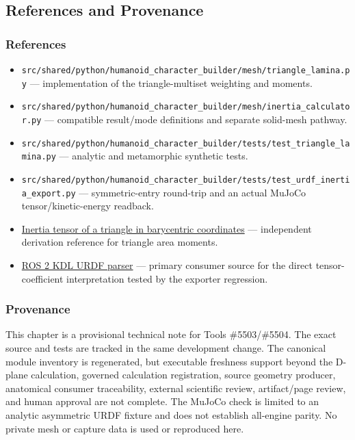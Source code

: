 \documentclass[
  american,
]{article}
\providecommand{\tightlist}{%
  \setlength{\itemsep}{0pt}\setlength{\parskip}{0pt}}
\begin{document}
\subsection{References and
Provenance}\label{references-and-provenance-1}

\subsubsection{References}\label{references-2}

\begin{itemize}
\tightlist
\item
  \texttt{src/shared/python/humanoid\_character\_builder/mesh/triangle\_lamina.py}
  --- implementation of the triangle-multiset weighting and moments.
\item
  \texttt{src/shared/python/humanoid\_character\_builder/mesh/inertia\_calculator.py}
  --- compatible result/mode definitions and separate solid-mesh
  pathway.
\item
  \texttt{src/shared/python/humanoid\_character\_builder/tests/test\_triangle\_lamina.py}
  --- analytic and metamorphic synthetic tests.
\item
  \texttt{src/shared/python/humanoid\_character\_builder/tests/test\_urdf\_inertia\_export.py}
  --- symmetric-entry round-trip and an actual MuJoCo
  tensor/kinetic-energy readback.
\item
  \href{https://pure.korea.ac.kr/en/publications/inertia-tensor-of-a-triangle-in-barycentric-coordinates/}{Inertia
  tensor of a triangle in barycentric coordinates} --- independent
  derivation reference for triangle area moments.
\item
  \href{https://github.com/ros/kdl_parser/blob/ros2/kdl_parser/src/kdl_parser.cpp}{ROS
  2 KDL URDF parser} --- primary consumer source for the direct
  tensor-coefficient interpretation tested by the exporter regression.
\end{itemize}

\subsubsection{Provenance}\label{provenance-1}

This chapter is a provisional technical note for Tools \#5503/\#5504.
The exact source and tests are tracked in the same development change.
The canonical module inventory is regenerated, but executable freshness
support beyond the D-plane calculation, governed calculation
registration, source geometry producer, anatomical consumer
traceability, external scientific review, artifact/page review, and
human approval are not complete. The MuJoCo check is limited to an
analytic asymmetric URDF fixture and does not establish all-engine
parity. No private mesh or capture data is used or reproduced here.
\end{document}
